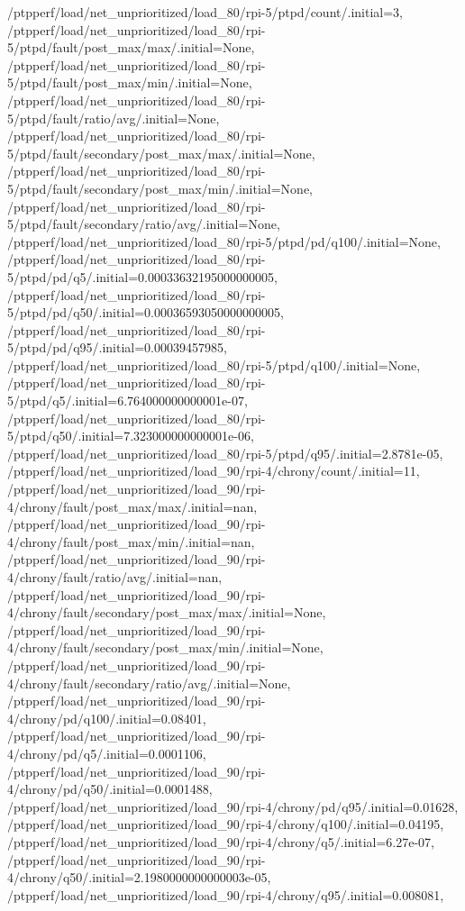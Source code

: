 {    /ptpperf/load/net_unprioritized/load_80/rpi-5/ptpd/count/.initial=3,
    /ptpperf/load/net_unprioritized/load_80/rpi-5/ptpd/fault/post_max/max/.initial=None,
    /ptpperf/load/net_unprioritized/load_80/rpi-5/ptpd/fault/post_max/min/.initial=None,
    /ptpperf/load/net_unprioritized/load_80/rpi-5/ptpd/fault/ratio/avg/.initial=None,
    /ptpperf/load/net_unprioritized/load_80/rpi-5/ptpd/fault/secondary/post_max/max/.initial=None,
    /ptpperf/load/net_unprioritized/load_80/rpi-5/ptpd/fault/secondary/post_max/min/.initial=None,
    /ptpperf/load/net_unprioritized/load_80/rpi-5/ptpd/fault/secondary/ratio/avg/.initial=None,
    /ptpperf/load/net_unprioritized/load_80/rpi-5/ptpd/pd/q100/.initial=None,
    /ptpperf/load/net_unprioritized/load_80/rpi-5/ptpd/pd/q5/.initial=0.00033632195000000005,
    /ptpperf/load/net_unprioritized/load_80/rpi-5/ptpd/pd/q50/.initial=0.00036593050000000005,
    /ptpperf/load/net_unprioritized/load_80/rpi-5/ptpd/pd/q95/.initial=0.00039457985,
    /ptpperf/load/net_unprioritized/load_80/rpi-5/ptpd/q100/.initial=None,
    /ptpperf/load/net_unprioritized/load_80/rpi-5/ptpd/q5/.initial=6.764000000000001e-07,
    /ptpperf/load/net_unprioritized/load_80/rpi-5/ptpd/q50/.initial=7.323000000000001e-06,
    /ptpperf/load/net_unprioritized/load_80/rpi-5/ptpd/q95/.initial=2.8781e-05,
    /ptpperf/load/net_unprioritized/load_90/rpi-4/chrony/count/.initial=11,
    /ptpperf/load/net_unprioritized/load_90/rpi-4/chrony/fault/post_max/max/.initial=nan,
    /ptpperf/load/net_unprioritized/load_90/rpi-4/chrony/fault/post_max/min/.initial=nan,
    /ptpperf/load/net_unprioritized/load_90/rpi-4/chrony/fault/ratio/avg/.initial=nan,
    /ptpperf/load/net_unprioritized/load_90/rpi-4/chrony/fault/secondary/post_max/max/.initial=None,
    /ptpperf/load/net_unprioritized/load_90/rpi-4/chrony/fault/secondary/post_max/min/.initial=None,
    /ptpperf/load/net_unprioritized/load_90/rpi-4/chrony/fault/secondary/ratio/avg/.initial=None,
    /ptpperf/load/net_unprioritized/load_90/rpi-4/chrony/pd/q100/.initial=0.08401,
    /ptpperf/load/net_unprioritized/load_90/rpi-4/chrony/pd/q5/.initial=0.0001106,
    /ptpperf/load/net_unprioritized/load_90/rpi-4/chrony/pd/q50/.initial=0.0001488,
    /ptpperf/load/net_unprioritized/load_90/rpi-4/chrony/pd/q95/.initial=0.01628,
    /ptpperf/load/net_unprioritized/load_90/rpi-4/chrony/q100/.initial=0.04195,
    /ptpperf/load/net_unprioritized/load_90/rpi-4/chrony/q5/.initial=6.27e-07,
    /ptpperf/load/net_unprioritized/load_90/rpi-4/chrony/q50/.initial=2.1980000000000003e-05,
    /ptpperf/load/net_unprioritized/load_90/rpi-4/chrony/q95/.initial=0.008081,
}
